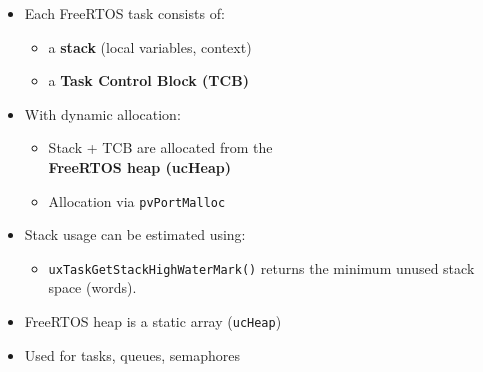   \begin{minipage}[t]{0.6\linewidth}
    \vspace{0pt}
    \begin{itemize}
      \item Each FreeRTOS task consists of:
      \begin{itemize}
          \item a \textbf{stack} (local variables, context)
          \item a \textbf{Task Control Block (TCB)}
      \end{itemize}
  
      \item With dynamic allocation:
      \begin{itemize}
          \item Stack + TCB are allocated from the\\ \textbf{FreeRTOS heap (ucHeap)}
          \item Allocation via \texttt{pvPortMalloc}
      \end{itemize}
  
      \item Stack usage can be estimated using:
      \begin{itemize}
        \item \texttt{uxTaskGetStackHighWaterMark()} returns the minimum unused stack space (words).
      \end{itemize}
    \end{itemize}
  
      \begin{itemize}
          \item FreeRTOS heap is a static array (\texttt{ucHeap})
          \item Used for tasks, queues, semaphores
      \end{itemize}

\end{minipage}\hfill
\begin{minipage}[t]{0.38\linewidth}
  \vspace{0pt}
\end{minipage}


